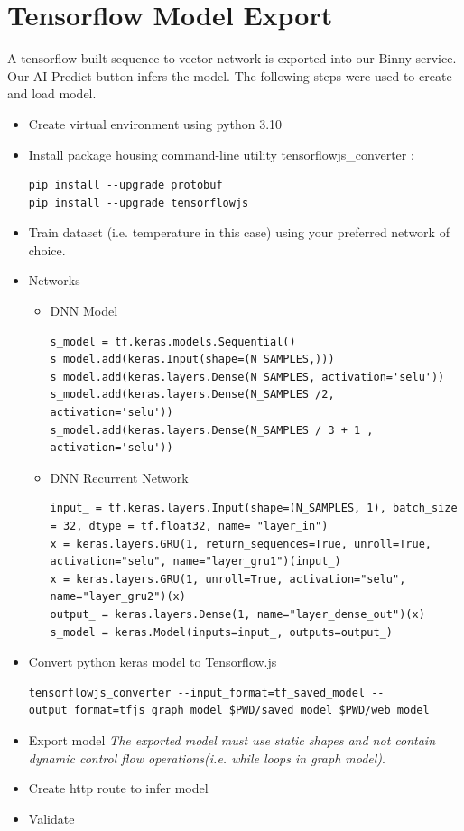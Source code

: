 \documentclass[a4paper,11pt]{article}
\begin{document}
    \section{Tensorflow Model Export}
    A tensorflow built sequence-to-vector network is exported into our Binny service. Our AI-Predict button infers the model. The following steps were used to create and load model.
    \begin{itemize}
        \item Create virtual environment using python 3.10  
        \item Install package housing command-line utility tensorflowjs\_converter : 
        \begin{verbatim} 
pip install --upgrade protobuf
pip install --upgrade tensorflowjs  
        \end{verbatim} 
        \item Train dataset (i.e. temperature in this case) using your preferred network of choice.   
        \item Networks   

        \begin{itemize}
            \item DNN Model 
            \begin{verbatim} 
s_model = tf.keras.models.Sequential()
s_model.add(keras.Input(shape=(N_SAMPLES,)))
s_model.add(keras.layers.Dense(N_SAMPLES, activation='selu'))
s_model.add(keras.layers.Dense(N_SAMPLES /2, activation='selu'))
s_model.add(keras.layers.Dense(N_SAMPLES / 3 + 1 , activation='selu'))
            \end{verbatim} 
        
        \item DNN Recurrent Network
            \begin{verbatim} 
input_ = tf.keras.layers.Input(shape=(N_SAMPLES, 1), batch_size = 32, dtype = tf.float32, name= "layer_in")
x = keras.layers.GRU(1, return_sequences=True, unroll=True, activation="selu", name="layer_gru1")(input_)
x = keras.layers.GRU(1, unroll=True, activation="selu", name="layer_gru2")(x)
output_ = keras.layers.Dense(1, name="layer_dense_out")(x)
s_model = keras.Model(inputs=input_, outputs=output_)
            \end{verbatim} 
        \end{itemize}

        \item Convert python keras model to Tensorflow.js   
            \begin{verbatim} 
tensorflowjs_converter --input_format=tf_saved_model --output_format=tfjs_graph_model $PWD/saved_model $PWD/web_model             
            \end{verbatim} 
        \item Export model  \smallskip 
            \small\textit{The exported model must use static shapes and not contain dynamic control flow operations(i.e.  while loops in graph model)}.
        \item Create http route to infer model    \smallskip 
        \item Validate  \smallskip 
        
    \end{itemize} 
\end{document}
